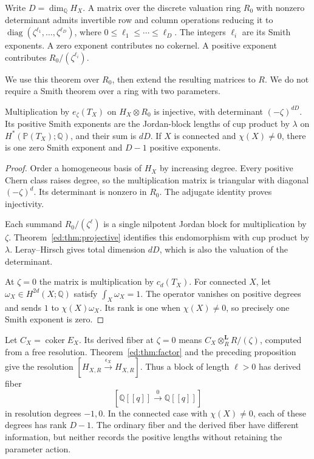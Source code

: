 Write $D=\dim_{\mathbb Q}H_X$. A matrix over the discrete valuation
ring $R_0$ with nonzero determinant admits invertible row and column
operations reducing it to
$\operatorname{diag}(\zeta^{\ell_1},\ldots,\zeta^{\ell_D})$,
where $0\leq\ell_1\leq\cdots\leq\ell_D$.
The integers $\ell_i$ are its Smith exponents. A zero exponent contributes
no cokernel. A positive exponent contributes $R_0/(\zeta^{\ell_i})$.

We use this theorem over $R_0$, then extend the resulting matrices to
$R$. We do not require a Smith theorem over a ring with two parameters.

\begin{proposition}\label{ed:prop:jordan}
Multiplication by $e_\zeta(T_X)$ on $H_X\otimes R_0$ is injective,
with determinant $(-\zeta)^{dD}$. Its positive Smith exponents are the
Jordan-block lengths of cup product by $\lambda$ on
$H^*(\mathbb P(T_X);\mathbb Q)$, and their sum is $dD$.
If $X$ is connected and $\chi(X)\ne0$, there is one zero Smith exponent
and $D-1$ positive exponents.
\end{proposition}

\begin{proof}
Order a homogeneous basis of $H_X$ by increasing degree. Every positive
Chern class raises degree, so the multiplication matrix is triangular
with diagonal $(-\zeta)^d$. Its determinant is nonzero in $R_0$.
The adjugate identity proves injectivity.

Each summand $R_0/(\zeta^\ell)$ is a single nilpotent Jordan block
for multiplication by $\zeta$. Theorem~\ref{ed:thm:projective}
identifies this endomorphism with cup product by $\lambda$.
Leray--Hirsch gives total dimension $dD$, which is also the valuation
of the determinant.

At $\zeta=0$ the matrix is multiplication by $c_d(T_X)$.
For connected $X$, let $\omega_X\in H^{2d}(X;\mathbb Q)$ satisfy
$\int_X\omega_X=1$. The operator vanishes on positive degrees
and sends $1$ to $\chi(X)\omega_X$. Its rank is one when
$\chi(X)\ne0$, so precisely one Smith exponent is zero.
\end{proof}

Let $C_X=\operatorname{coker}E_X$. Its derived fiber at $\zeta=0$
means $C_X\otimes_R^{\mathbf L}R/(\zeta)$, computed from a free
resolution. Theorem~\ref{ed:thm:factor} and the preceding proposition
give the resolution $[H_{X,R}\xrightarrow{\epsilon_X}H_{X,R}]$.
Thus a block of length $\ell>0$ has derived fiber
\[
 [\mathbb Q[[q]]\xrightarrow{0}\mathbb Q[[q]]]
\]
in resolution degrees $-1,0$. In the connected case with $\chi(X)\ne0$,
each of these degrees has rank $D-1$. The ordinary fiber and the derived
fiber have different information, but neither records the positive
lengths without retaining the parameter action.

